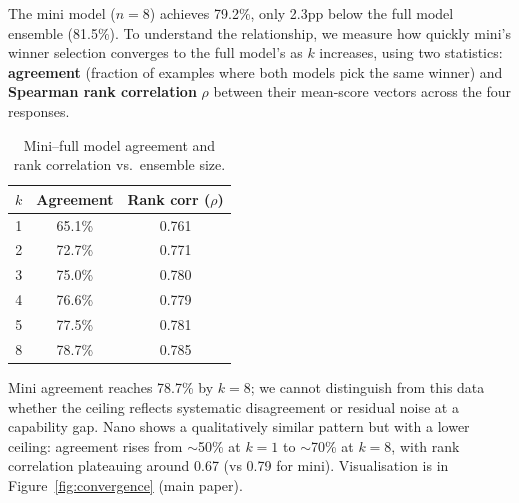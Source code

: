 \documentclass{article}
\begin{document}
The mini model ($n{=}8$) achieves 79.2\%, only 2.3pp below the full model ensemble (81.5\%). To understand the relationship, we measure how quickly mini's winner selection converges to the full model's as $k$ increases, using two statistics: \textbf{agreement} (fraction of examples where both models pick the same winner) and \textbf{Spearman rank correlation} $\rho$ between their mean-score vectors across the four responses.

\begin{table}[ht]
\centering
\caption{Mini--full model agreement and rank correlation vs.\ ensemble size.}
\label{tab:convergence}
\begin{tabular}{ccc}
\toprule
$k$ & Agreement & Rank corr ($\rho$) \\
\midrule
1 & 65.1\% & 0.761 \\
2 & 72.7\% & 0.771 \\
3 & 75.0\% & 0.780 \\
4 & 76.6\% & 0.779 \\
5 & 77.5\% & 0.781 \\
8 & 78.7\% & 0.785 \\
\bottomrule
\end{tabular}
\end{table}

Mini agreement reaches 78.7\% by $k{=}8$; we cannot distinguish from this data whether the ceiling reflects systematic disagreement or residual noise at a capability gap. Nano shows a qualitatively similar pattern but with a lower ceiling: agreement rises from ${\sim}$50\% at $k{=}1$ to ${\sim}$70\% at $k{=}8$, with rank correlation plateauing around 0.67 (vs 0.79 for mini). Visualisation is in Figure~\ref{fig:convergence} (main paper).
\end{document}
